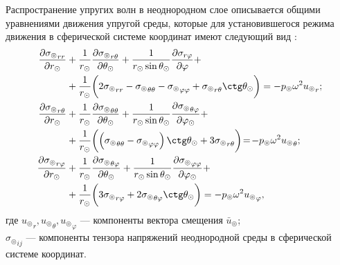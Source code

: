 Распространение упругих волн в неоднородном слое описывается общими уравнениями движения упругой среды, которые для установившегося режима движения в сферической системе координат имеют следующий вид \cite{Nowacki}:
\begin{equation}\label{eq_moving}
\begin{split}
\frac{\partial{\sigma_\circledcirc}_{rr}}{\partial r_\odot} &+ \frac1{r_\odot} \frac{\partial{\sigma_\circledcirc}_{r\theta}}{\partial\theta_\odot} + \frac{1}{r_\odot\sin\theta_\odot}\frac{\partial\sigma_{r\varphi}}{\partial\varphi} +\\
&+ \frac1{r_\odot}\biggl(2{\sigma_\circledcirc}_{rr}-{\sigma_\circledcirc}_{\theta\theta}-{\sigma_\circledcirc}_{\varphi\varphi}+{\sigma_\circledcirc}_{r\theta}\ctg\theta_\odot\biggr)=-p_\circledcirc\omega^2{u_\circledcirc}_r;\\
\frac{\partial{\sigma_\circledcirc}_{r\theta}}{\partial r_\odot} &+ \frac1{r_\odot} \frac{\partial{\sigma_\circledcirc}_{\theta\theta}}{\partial\theta_\odot} + \frac{1}{r_\odot\sin\theta_\odot}\frac{\partial{\sigma_\circledcirc}_{\theta\varphi}}{\partial\varphi_\odot} +\\
&+ \frac1{r_\odot}\biggl(\left({\sigma_\circledcirc}_{\theta\theta}-{\sigma_\circledcirc}_{\varphi\varphi}\right)\ctg\theta_\odot+3{\sigma_\circledcirc}_{r\theta}\biggr)\!=\!-p_\circledcirc\omega^2{u_\circledcirc}_\theta;\\
\frac{\partial{\sigma_\circledcirc}_{r\varphi}}{\partial r_\odot} &+ \frac1{r_\odot} \frac{\partial{\sigma_\circledcirc}_{\theta\varphi}}{\partial\theta_\odot} + \frac{1}{r_\odot\sin\theta_\odot}\frac{\partial{\sigma_\circledcirc}_{\varphi\varphi}}{\partial\varphi_\odot} +\\
&+ \frac1{r_\odot}\biggl(3{\sigma_\circledcirc}_{r\varphi}+2{\sigma_\circledcirc}_{\theta\varphi}\ctg\theta_\odot\biggr)=-p_\circledcirc\omega^2{u_\circledcirc}_\varphi,
\end{split}
\end{equation}
где ${u_\circledcirc}_r, {u_\circledcirc}_\theta, {u_\circledcirc}_\varphi$ --- компоненты вектора смещения $\bar{u}_\circledcirc$;\\
${\sigma_\circledcirc}_{ij}$ --- компоненты тензора напряжений неоднородной среды в сферической системе координат.

